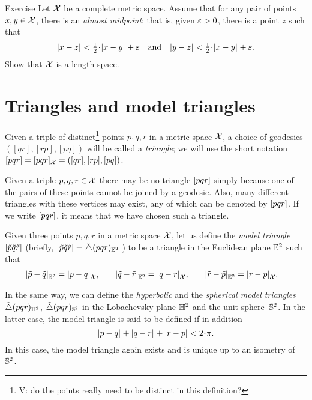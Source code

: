 \begin{thm}{Exercise}\label{ex:menger}
Let $\mathcal{X}$ be a complete metric space.
Assume that for any pair of points $x,y\in \mathcal{X}$, 
there is an \emph{almost midpoint};
that is, given $\varepsilon>0$, there is a point $z$ such that 
\[\dist{x}{z}{}<\tfrac12\cdot\dist{x}{y}{}+\eps 
\quad\text{and}\quad
\dist{y}{z}{}<\tfrac12\cdot\dist{x}{y}{}+\eps.\]
Show that $\mathcal{X}$ is a length space.
\end{thm}


\section{Triangles and model triangles}

Given a triple of distinct\footnote{ \red V: do the points really need to be distinct in this definition?} points $p,q,r$ in a metric space $\mathcal{X}$, a choice of geodesics $([q r], [r p], [p q])$ will be called a \emph{triangle}; we will use the short notation 
$[pqr]=[pqr]_{\mathcal{X}}=([q r], [r p], [p q])$.

Given a triple $p,q,r\in \mathcal{X}$ there may be no triangle 
$[pqr]$ simply because one of the pairs of these points cannot be joined by a geodesic.
Also, many different triangles with these vertices may exist, any of which can be denoted by $[pqr]$.
If we write $[pqr]$, it means that we have chosen such a triangle.


Given three points $p,q,r$ in a metric space $\mathcal{X}$,
let us define the \emph{model triangle} $[\tilde p\tilde q\tilde r]$ 
(briefly, 
$[\tilde p\tilde q\tilde r]=\tilde\triangle(p q r)_{\mathbb{E}^2}$%
) to be a triangle in the Euclidean plane $\mathbb{E}^2$ such that
\begin{align*}|{\tilde p}-{\tilde q}|_{\mathbb{E}^2}^{{}}&=|{p}-{q}|_{\mathcal{X}}^{{}},
&
\quad|{\tilde q}-{\tilde r}|_{\mathbb{E}^2}^{{}}&=|{q}-{r}|_{\mathcal{X}}^{{}},
&
\quad|{\tilde r}-{\tilde p}|_{\mathbb{E}^2}^{{}}&=|{r}-{p}|_{\mathcal{X}}^{{}}.
\end{align*}

In the same way, we can define the \emph{hyperbolic} and the \emph{spherical model triangles} $\tilde\triangle(p q r)_{\mathbb{H}^2}$, $\tilde\triangle(p q r)_{\mathbb{S}^2}$
in the Lobachevsky plane $\mathbb{H}^2$ and the unit sphere~$\mathbb{S}^2$.
In the latter case, the model triangle is said to be defined if in addition
\[\dist{p}{q}{}+\dist{q}{r}{}+\dist{r}{p}{}< 2\cdot\pi.\]
In this case, the model triangle again exists and is unique up to an isometry of~$\mathbb{S}^2$.

